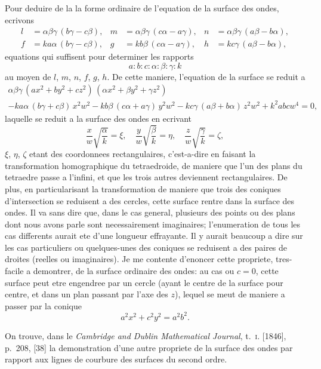 \documentclass[12pt,a4paper]{article}
\theoremstyle{plain}
\begin{document}
Pour deduire de la la forme ordinaire de l'equation de la surface des ondes, ecrivons
\begin{align*}
l &= \alpha\beta\gamma\,(b\gamma - c\beta), & m &= \alpha\beta\gamma\,(c\alpha - a\gamma), & n &= \alpha\beta\gamma\,(a\beta - b\alpha), \\
f &= ka\alpha\,(b\gamma - c\beta), & g &= kb\beta\,(c\alpha - a\gamma), & h &= kc\gamma\,(a\beta - b\alpha),
\end{align*}
equations qui suffisent pour determiner les rapports
\[
a : b : c : \alpha : \beta : \gamma : k
\]
au moyen de $l$, $m$, $n$, $f$, $g$, $h$. De cette maniere, l'equation de la surface se reduit a
\begin{multline*}
\alpha\beta\gamma\,(ax^2 + by^2 + cz^2)\,(\alpha x^2 + \beta y^2 + \gamma z^2) \\
- ka\alpha\,(b\gamma + c\beta)\,x^2w^2 - kb\beta\,(c\alpha + a\gamma)\,y^2w^2 - kc\gamma\,(a\beta + b\alpha)\,z^2w^2 + k^2abcw^4 = 0,
\end{multline*}
laquelle se reduit a la surface des ondes en ecrivant
\[
\frac{x}{w}\sqrt{\frac{\alpha}{k}} = \xi, \quad \frac{y}{w}\sqrt{\frac{\beta}{k}} = \eta, \quad \frac{z}{w}\sqrt{\frac{\gamma}{k}} = \zeta,
\]
$\xi$, $\eta$, $\zeta$ etant des coordonnees rectangulaires, c'est-a-dire en faisant la transformation homographique du tetraedroide, de maniere que l'un des plans du tetraedre passe a l'infini, et que les trois autres deviennent rectangulaires. De plus, en particularisant la transformation de maniere que trois des coniques d'intersection se reduisent a des cercles, cette surface rentre dans la surface des ondes. Il va sans dire que, dans le cas general, plusieurs des points ou des plans dont nous avons parle sont necessairement imaginaires; l'enumeration de tous les cas differents aurait ete d'une longueur effrayante. Il y aurait beaucoup a dire sur les cas particuliers ou quelques-unes des coniques se reduisent a des paires de droites (reelles ou imaginaires). Je me contente d'enoncer cette propriete, tres-facile a demontrer, de la surface ordinaire des ondes: au cas ou $c = 0$, cette surface peut etre engendree par un cercle (ayant le centre de la surface pour centre, et dans un plan passant par l'axe des $z$), lequel se meut de maniere a passer par la conique
\[
a^2x^2 + c^2y^2 = a^2b^2.
\]

On trouve, dans le \textit{Cambridge and Dublin Mathematical Journal}, t.~\textsc{i}. [1846], p.~208, [38] la demonstration d'une autre propriete de la surface des ondes par rapport aux lignes de courbure des surfaces du second ordre.
\end{document}
